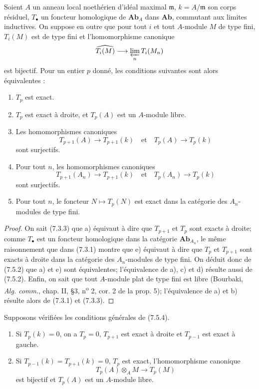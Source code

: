 \begin{proposition}[7.5.4]
Soient $A$ un anneau local noethérien d'idéal maximal $\mathfrak m$,
$k=A/\mathfrak m$ son corps résiduel, $T_\bullet$ un foncteur homologique de
$\mathbf{Ab}_A$ dans $\mathbf{Ab}$, commutant aux limites inductives. On suppose
en outre que pour tout $i$ et tout $A$-module $M$ de type fini, $T_i(M)$ est de
type fini et l'homomorphisme canonique
\[
  \widehat{T_i(M)}
  \longrightarrow
  \varprojlim_n T_i(M_n)
\]
est bijectif. Pour un entier $p$ donné, les conditions suivantes sont alors
équivalentes :
\begin{enumerate}
  \item[a)] $T_p$ est exact.
  \item[b)] $T_p$ est exact à droite, et $T_p(A)$ est un $A$-module libre.
  \item[c)] Les homomorphismes canoniques
    \[
      T_{p+1}(A)\longrightarrow T_{p+1}(k)
      \quad\text{et}\quad
      T_p(A)\longrightarrow T_p(k)
    \]
    sont surjectifs.
  \item[d)] Pour tout $n$, les homomorphismes canoniques
    \[
      T_{p+1}(A_n)\longrightarrow T_{p+1}(k)
      \quad\text{et}\quad
      T_p(A_n)\longrightarrow T_p(k)
    \]
    sont surjectifs.
  \item[e)] Pour tout $n$, le foncteur $N\mapsto T_p(N)$ est exact dans la
    catégorie des $A_n$-modules de type fini.
\end{enumerate}
\end{proposition}

\begin{proof}
On sait (7.3.3) que a) équivaut à dire que $T_{p+1}$ et $T_p$ sont exacts à
droite; comme $T_\bullet$ est un foncteur homologique dans la catégorie
$\mathbf{Ab}_{A_n}$, le même raisonnement que dans (7.3.1) montre que e)
équivaut à dire que $T_p$ et $T_{p+1}$ sont exacts à droite dans la catégorie
des $A_n$-modules de type fini. On déduit donc de (7.5.2) que a) et e) sont
équivalentes; l'équivalence de a), c) et d) résulte aussi de (7.5.2). Enfin, on
sait que tout $A$-module plat de type fini est libre (Bourbaki,
\emph{Alg. comm.}, chap. II, \S 3, n\textsuperscript{o} 2, cor. 2 de la prop.
5); l'équivalence de a) et b) résulte alors de (7.3.1) et (7.3.3).
\end{proof}

\begin{corollary}[7.5.5]
Supposons vérifiées les conditions générales de (7.5.4).
\begin{enumerate}
  \item[(i)] Si $T_p(k)=0$, on a $T_p=0$, $T_{p+1}$ est exact à droite et
    $T_{p-1}$ est exact à gauche.
  \item[(ii)] Si $T_{p-1}(k)=T_{p+1}(k)=0$, $T_p$ est exact,
    l'homomorphisme canonique
    \[
      T_p(A)\otimes_A M\longrightarrow T_p(M)
    \]
    est bijectif et $T_p(A)$ est un $A$-module libre.
\end{enumerate}
\end{corollary}

